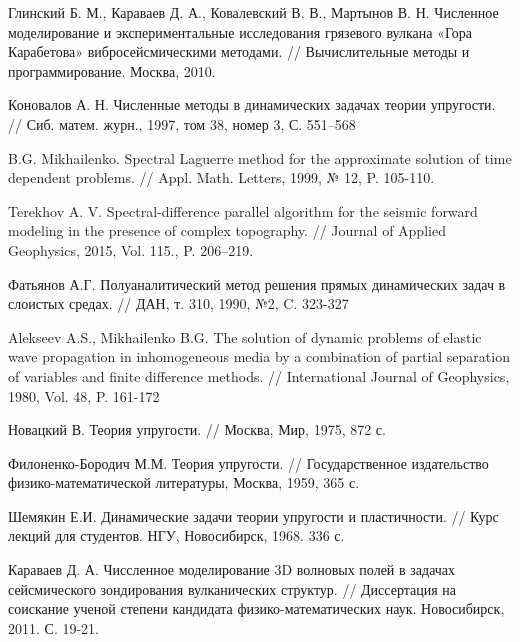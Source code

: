 \begingroup 
\renewcommand{\section}[2]{\anonsection{Библиографический список}}
\begin{thebibliography}{00}

    Глинский Б. М., Караваев Д. А., Ковалевский В. В., Мартынов В. Н.
    Численное моделирование и экспериментальные исследования грязевого вулкана «Гора Карабетова» вибросейсмическими методами. //
    Вычислительные методы и программирование. Москва, 2010.

	Коновалов А. Н.
	Численные методы в динамических задачах теории упругости. //
	Сиб. матем. журн., 1997, том 38, номер 3, С. 551–568

	B.G. Mikhailenko.
	Spectral Laguerre method for the approximate solution of time dependent problems. //
	Appl. Math. Letters, 1999, № 12, P. 105-110.

	Terekhov A. V. Spectral-difference parallel algorithm for the seismic forward modeling in the presence of complex topography. //
	Journal of Applied Geophysics, 2015, Vol. 115., P. 206–219.

	Фатьянов А.Г.
	Полуаналитический метод решения прямых динамических задач в слоистых средах. //
	ДАН, т. 310, 1990, №2, C. 323-327 

	Alekseev A.S., Mikhailenko B.G.
	The solution of dynamic problems of elastic wave propagation in inhomogeneous media by a combination of partial separation of variables and finite difference methods. //
	International Journal of Geophysics, 1980, Vol. 48, P. 161-­172

    Новацкий В.
    Теория упругости. //
    Москва, Мир, 1975, 872 с.

	Филоненко-Бородич М.М.
	Теория упругости. //
	Государственное издательство физико-математической литературы, Москва, 1959, 365 с.

	Шемякин Е.И.
	Динамические задачи теории упругости и пластичности. //
	Курс лекций для студентов. НГУ, Новосибирск, 1968. 336 с.

    Караваев Д. А.
    Чиссленное моделирование 3D волновых полей в задачах сейсмического зондирования вулканических структур. //
    Диссертация на соискание ученой степени кандидата физико-математических наук. Новосибирск, 2011. С. 19-21.


\end{thebibliography}
